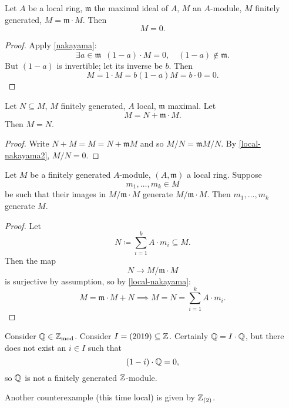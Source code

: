 \begin{corollary}
  \label{local-nakayama}
  Let $A$ be a local ring, $\mathfrak m$ the maximal ideal of $A$, $M$ an $A$-module, $M$ finitely generated, $M = \mathfrak m \cdot M$. Then
  \[ M = 0.\]
\end{corollary}
\begin{proof}
  Apply \cref{nakayama}:
  \[ \exists a \in \mathfrak m \enspace (1-a) \cdot M = 0, \quad (1-a) \notin \mathfrak m.\]
  But $(1 - a)$ is invertible; let its inverse be $b$. Then
  \[ M = 1 \cdot M = b(1-a) M = b \cdot 0 = 0.\]
\end{proof}

\begin{corollary}
  \label{local-nakayama2}
  Let $N \subseteq M$, $M$ finitely generated, $A$ local, $\mathfrak m$ maximal. Let
  \[ M = N + \mathfrak m \cdot M.\]
  Then $M = N$.
\end{corollary}
\begin{proof}
  Write
  \(N + M = M = N + \mathfrak m M\)
  and so
  \(M /{N} = \mathfrak m M /{N}.\)
  By \cref{local-nakayama2},
  $M / {N} = 0$.
\end{proof}

\begin{corollary}
  Let $M$ be a finitely generated $A$-module, $(A, \mathfrak m)$ a local ring. Suppose
  \[ m_1, \dotsc, m_k \in M\]
  be such that their images in $M / {\mathfrak m \cdot M}$ generate $M / {\mathfrak m \cdot M}$. Then $m_1, \dotsc, m_k$ generate $M$.
\end{corollary}
\begin{proof}
  Let
  \[ N \coloneqq \sum_{i=1}^k A \cdot m_i \subseteq M.\]
  Then the map
  \[ N \to M / {\mathfrak m \cdot M}\]
  is surjective by assumption, so by \cref{local-nakayama}:
  \[ M = \mathfrak m \cdot M + N \implies M = N = \sum_{i=1}^k A \cdot m_i.\]
\end{proof}

\begin{example}
  Consider $\mathbb Q \in \mathbb Z_\text{mod}$. Consider $I = (2019) \subseteq \mathbb Z$.
  Certainly $\mathbb Q = I \cdot \mathbb Q$, but there does not exist an $i \in I$ such that
  \[ (1-i) \cdot \mathbb Q = 0,\]
  so $\mathbb Q$ is not a finitely generated $\mathbb Z$-module. 
\end{example}

\begin{example}
  Another counterexample (this time local) is given by $\mathbb Z_{(2)}$.
\end{example}

